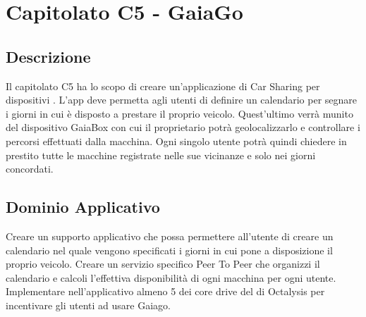\clearpage
\section{Capitolato C5 - GaiaGo}
\subsection{Descrizione}
Il capitolato C5 ha lo scopo di creare un'applicazione di Car Sharing per dispositivi . L'app deve permetta agli utenti di definire un calendario per segnare i giorni in cui è disposto a prestare il proprio veicolo. Quest'ultimo verrà munito del dispositivo GaiaBox con cui il proprietario potrà geolocalizzarlo e controllare i percorsi effettuati dalla macchina. Ogni singolo utente potrà quindi chiedere in prestito tutte le macchine registrate nelle sue vicinanze e solo nei giorni concordati.

\subsection{Dominio Applicativo}
Creare un supporto applicativo che possa permettere all'utente di creare un calendario nel quale vengono specificati i giorni in cui pone a disposizione il proprio veicolo.
Creare un servizio specifico Peer To Peer che organizzi il calendario e calcoli l'effettiva disponibilità di ogni macchina per ogni utente.
Implementare nell'applicativo almeno 5 dei core drive del  di Octalysis per incentivare gli utenti ad usare Gaiago.

